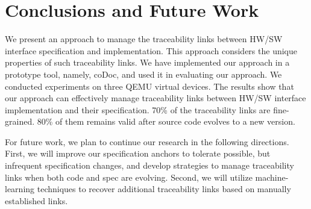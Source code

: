 \section{Conclusions and Future Work}
\label{sec:conclusion}
We present an approach to manage the traceability links between HW/SW interface specification and implementation. This approach considers the unique properties of such traceability links. We have implemented our approach in a prototype tool, namely, coDoc, and used it in evaluating our approach. We conducted experiments on three QEMU virtual devices. The results show that our approach can effectively manage traceability links between HW/SW interface implementation and their specification. 70\% of the traceability links are fine-grained. 80\% of them remains valid after source code evolves to a new version.

For future work, we plan to continue our research in the following directions. First, we will improve our specification anchors to tolerate possible, but infrequent specification changes, and develop strategies to manage traceability links when both code and spec are evolving. Second, we will utilize machine-learning techniques to recover additional traceability links based on manually established links.
